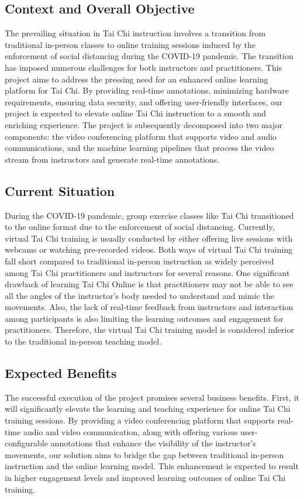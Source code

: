 \documentclass[12pt]{article}
\begin{document}
\subsection{Context and Overall Objective}
The prevailing situation in Tai Chi instruction involves a transition from traditional in-person classes to online training sessions induced by the enforcement of social distancing during the COVID-19 pandemic. The transition has imposed numerous challenges for both instructors and practitioners. This project aims to address the pressing need for an enhanced online learning platform for Tai Chi. By providing real-time annotations, minimizing hardware requirements, ensuring data security, and offering user-friendly interfaces, our project is expected to elevate online Tai Chi instruction to a smooth and enriching experience. The project is subsequently decomposed into two major components: the video conferencing platform that supports video and audio communications, and the machine learning pipelines that process the video stream from instructors and generate real-time annotations.

\subsection{Current Situation}
During the COVID-19 pandemic, group exercise classes like Tai Chi transitioned to the online format due to the enforcement of social distancing. Currently, virtual Tai Chi training is usually conducted by either offering live sessions with webcams or watching pre-recorded videos. Both ways of virtual Tai Chi training fall short compared to traditional in-person instruction as widely perceived among Tai Chi practitioners and instructors for several reasons. One significant drawback of learning Tai Chi Online is that practitioners may not be able to see all the angles of the instructor’s body needed to understand and mimic the movements. Also, the lack of real-time feedback from instructors and interaction among participants is also limiting the learning outcomes and engagement for practitioners. Therefore, the virtual Tai Chi training model is considered inferior to the traditional in-person teaching model.

\subsection{Expected Benefits}
The successful execution of the project promises several business benefits. First, it will significantly elevate the learning and teaching experience for online Tai Chi training sessions. By providing a video conferencing platform that supports real-time audio and video communication, along with offering various user-configurable annotations that enhance the visibility of the instructor’s movements, our solution aims to bridge the gap between traditional in-person instruction and the online learning model. This enhancement is expected to result in higher engagement levels and improved learning outcomes of online Tai Chi training.
\end{document}
